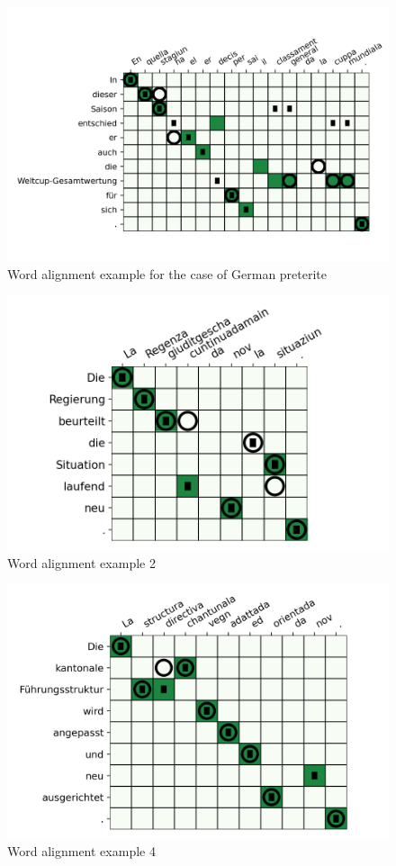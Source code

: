 \begin{figure}[ht]
\includegraphics{graphics/alignments/example-pret.png}
\caption{Word alignment example for the case of German preterite}\label{fig:pret2}
\end{figure}






\begin{figure}[ht]
\includegraphics{graphics/alignments/example2.png}
\caption{Word alignment example 2}
\end{figure}

\begin{figure}[ht]
\includegraphics{graphics/alignments/example4.png}
\caption{Word alignment example 4}
\end{figure}

